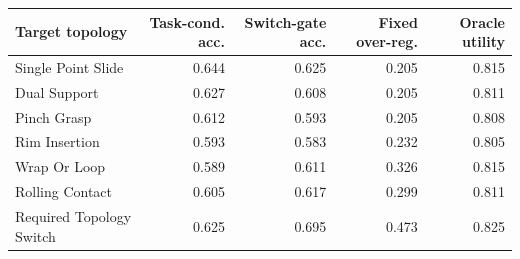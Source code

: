 \begin{tabular}{lrrrr}
\toprule
Target topology & Task-cond. acc. & Switch-gate acc. & Fixed over-reg. & Oracle utility \\
\midrule
Single Point Slide & 0.644 & 0.625 & 0.205 & 0.815 \\
Dual Support & 0.627 & 0.608 & 0.205 & 0.811 \\
Pinch Grasp & 0.612 & 0.593 & 0.205 & 0.808 \\
Rim Insertion & 0.593 & 0.583 & 0.232 & 0.805 \\
Wrap Or Loop & 0.589 & 0.611 & 0.326 & 0.815 \\
Rolling Contact & 0.605 & 0.617 & 0.299 & 0.811 \\
Required Topology Switch & 0.625 & 0.695 & 0.473 & 0.825 \\
\bottomrule
\end{tabular}
